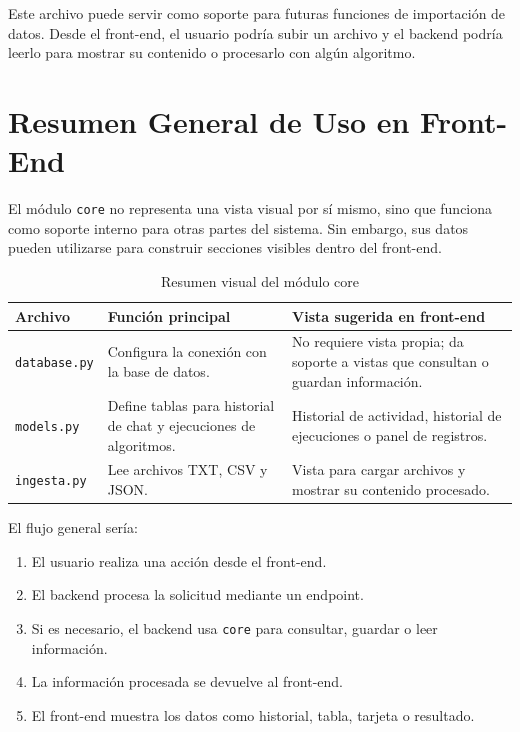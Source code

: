 \documentclass[12pt]{article}
\begin{document}
	Este archivo puede servir como soporte para futuras funciones de importación de datos. Desde el front-end, el usuario podría subir un archivo y el backend podría leerlo para mostrar su contenido o procesarlo con algún algoritmo.
	
	\section{Resumen General de Uso en Front-End}
	
	El módulo \texttt{core} no representa una vista visual por sí mismo, sino que funciona como soporte interno para otras partes del sistema. Sin embargo, sus datos pueden utilizarse para construir secciones visibles dentro del front-end.
	
	\begin{table}[H]
		\centering
		\begin{tabular}{|p{3.5cm}|p{5cm}|p{5.5cm}|}
			\hline
			\textbf{Archivo} & \textbf{Función principal} & \textbf{Vista sugerida en front-end} \\
			\hline
			\texttt{database.py} & Configura la conexión con la base de datos. & No requiere vista propia; da soporte a vistas que consultan o guardan información. \\
			\hline
			\texttt{models.py} & Define tablas para historial de chat y ejecuciones de algoritmos. & Historial de actividad, historial de ejecuciones o panel de registros. \\
			\hline
			\texttt{ingesta.py} & Lee archivos TXT, CSV y JSON. & Vista para cargar archivos y mostrar su contenido procesado. \\
			\hline
		\end{tabular}
		\caption{Resumen visual del módulo core}
	\end{table}
	
	El flujo general sería:
	
	\begin{enumerate}
		\item El usuario realiza una acción desde el front-end.
		\item El backend procesa la solicitud mediante un endpoint.
		\item Si es necesario, el backend usa \texttt{core} para consultar, guardar o leer información.
		\item La información procesada se devuelve al front-end.
		\item El front-end muestra los datos como historial, tabla, tarjeta o resultado.
	\end{enumerate}
	
\end{document}
